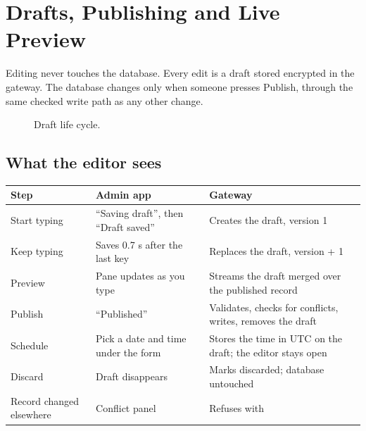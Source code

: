 \documentclass[11pt,a4paper]{article}
\newcommand{\code}[1]{\IfSubStr{\detokenize{#1}}{ }{\texttt{\detokenize{#1}}}{\texttt{\expandafter\seqsplit\expandafter{\detokenize{#1}}}}}
\begin{document}
\endgroup\begingroup\raggedright
\section{Drafts, Publishing and Live Preview}
Editing never touches the database. Every edit is a draft stored encrypted in the gateway. The database changes only when someone presses Publish, through the same checked write path as any other change.

\begin{figure}[h]
\centering
{}
\caption{Draft life cycle.}
\end{figure}

\subsection{What the editor sees}
\begin{tabularx}{\linewidth}{@{}>{\raggedright\arraybackslash}p{2.6cm}>{\raggedright\arraybackslash}p{4.4cm}X@{}}
\toprule
\textbf{Step} & \textbf{Admin app} & \textbf{Gateway}\\
\midrule
Start typing & ``Saving draft'', then ``Draft saved'' & Creates the draft, version 1\\
Keep typing & Saves 0.7 s after the last key & Replaces the draft, version + 1\\
Preview & Pane updates as you type & Streams the draft merged over the published record\\
Publish & ``Published'' & Validates, checks for conflicts, writes, removes the draft\\
Schedule & Pick a date and time under the form & Stores the time in UTC on the draft; the editor stays open\\
Discard & Draft disappears & Marks discarded; database untouched\\
Record changed elsewhere & Conflict panel & Refuses with \code{409 record_changed}\\
\bottomrule
\end{tabularx}\smallskip
\end{document}
